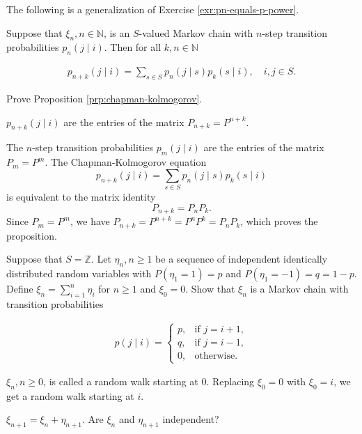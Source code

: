 The following is a generalization of Exercise \ref{exr:pn-equals-p-power}.

\begin{Proposition}
\label{prp:chapman-kolmogorov}
Suppose that $\xi_n, n\in\mathbb{N}$, is an $S$-valued Markov chain with $n$-step transition probabilities $p_n(j \mid i)$. Then for all $k, n\in\mathbb{N}$

\begin{align}
p_{n+k}(j \mid i) = \sum_{s\in S} p_n(j \mid s) p_k(s \mid i), \quad i,j\in S. \tag{5.18}
\end{align}
\end{Proposition}

\begin{Exercise}
\label{exr:prove-chapman-kolmogorov}
Prove Proposition \ref{prp:chapman-kolmogorov}.

\begin{hint}
$p_{n+k}(j \mid i)$ are the entries of the matrix $P_{n+k} = P^{n+k}$.
\end{hint}
\end{Exercise}

\begin{Solution}
The $n$-step transition probabilities $p_m(j \mid i)$ are the entries of the matrix $P_m = P^m$. The Chapman-Kolmogorov equation
\[
p_{n+k}(j \mid i) = \sum_{s \in S} p_n(j \mid s) p_k(s \mid i)
\]
is equivalent to the matrix identity
\[
P_{n+k} = P_n P_k.
\]
Since $P_m = P^m$, we have $P_{n+k} = P^{n+k} = P^n P^k = P_n P_k$, which proves the proposition.
\end{Solution}

\begin{Exercise}
\label{exr:random-walk}
Suppose that $S = \mathbb{Z}$. Let $\eta_n, n \geq 1$ be a sequence of independent identically distributed random variables with $P(\eta_1 = 1) = p$ and $P(\eta_1 = -1) = q = 1-p$. Define $\xi_n = \sum_{i=1}^n \eta_i$ for $n \geq 1$ and $\xi_0 = 0$. Show that $\xi_n$ is a Markov chain with transition probabilities

\begin{align}
p(j \mid i) = \begin{cases}
p, & \text{if } j = i+1, \\
q, & \text{if } j = i-1, \\
0, & \text{otherwise}.
\end{cases}
\end{align}

$\xi_n, n \geq 0$, is called a random walk starting at 0. Replacing $\xi_0 = 0$ with $\xi_0 = i$, we get a random walk starting at $i$.

\begin{hint}
$\xi_{n+1} = \xi_n + \eta_{n+1}$. Are $\xi_n$ and $\eta_{n+1}$ independent?
\end{hint}
\end{Exercise}

